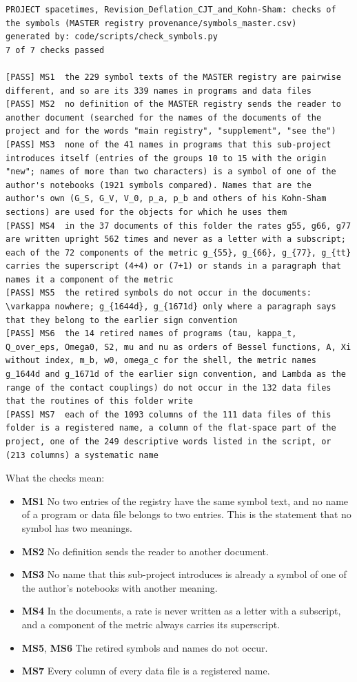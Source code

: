 \documentclass[
  10pt,
]{article}
\providecommand{\tightlist}{%
  \setlength{\itemsep}{0pt}\setlength{\parskip}{0pt}}
\begin{document}
\begin{verbatim}
PROJECT spacetimes, Revision_Deflation_CJT_and_Kohn-Sham: checks of the symbols (MASTER registry provenance/symbols_master.csv)
generated by: code/scripts/check_symbols.py
7 of 7 checks passed

[PASS] MS1  the 229 symbol texts of the MASTER registry are pairwise different, and so are its 339 names in programs and data files
[PASS] MS2  no definition of the MASTER registry sends the reader to another document (searched for the names of the documents of the project and for the words "main registry", "supplement", "see the")
[PASS] MS3  none of the 41 names in programs that this sub-project introduces itself (entries of the groups 10 to 15 with the origin "new"; names of more than two characters) is a symbol of one of the author's notebooks (1921 symbols compared). Names that are the author's own (G_S, G_V, V_0, p_a, p_b and others of his Kohn-Sham sections) are used for the objects for which he uses them
[PASS] MS4  in the 37 documents of this folder the rates g55, g66, g77 are written upright 562 times and never as a letter with a subscript; each of the 72 components of the metric g_{55}, g_{66}, g_{77}, g_{tt} carries the superscript (4+4) or (7+1) or stands in a paragraph that names it a component of the metric
[PASS] MS5  the retired symbols do not occur in the documents: \varkappa nowhere; g_{1644d}, g_{1671d} only where a paragraph says that they belong to the earlier sign convention
[PASS] MS6  the 14 retired names of programs (tau, kappa_t, Q_over_eps, Omega0, S2, mu and nu as orders of Bessel functions, A, Xi without index, m_b, w0, omega_c for the shell, the metric names g_1644d and g_1671d of the earlier sign convention, and Lambda as the range of the contact couplings) do not occur in the 132 data files that the routines of this folder write
[PASS] MS7  each of the 1093 columns of the 111 data files of this folder is a registered name, a column of the flat-space part of the project, one of the 249 descriptive words listed in the script, or (213 columns) a systematic name
\end{verbatim}

What the checks mean:

\begin{itemize}
\tightlist
\item
  \textbf{MS1} No two entries of the registry have the same symbol text,
  and no name of a program or data file belongs to two entries. This is
  the statement that no symbol has two meanings.
\item
  \textbf{MS2} No definition sends the reader to another document.
\item
  \textbf{MS3} No name that this sub-project introduces is already a
  symbol of one of the author's notebooks with another meaning.
\item
  \textbf{MS4} In the documents, a rate is never written as a letter
  with a subscript, and a component of the metric always carries its
  superscript.
\item
  \textbf{MS5}, \textbf{MS6} The retired symbols and names do not occur.
\item
  \textbf{MS7} Every column of every data file is a registered name.
\end{itemize}
\end{document}
